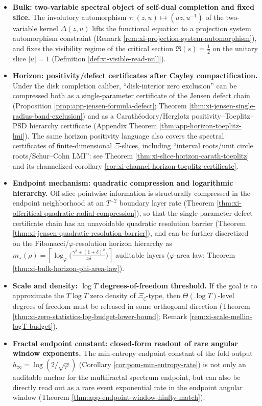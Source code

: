 \begin{itemize}
  \item \textbf{Bulk: two-variable spectral object of self-dual completion and fixed slice.}
  The involutory automorphism \(\tau:(z,u)\mapsto(uz,u^{-1})\) of the two-variable kernel \(\Delta(z,u)\) lifts the functional equation to a projection system automorphism constraint (Remark \ref{rem:xi-projection-system-automorphism}), and fixes the visibility regime of the critical section \(\Re(s)=\tfrac12\) on the unitary slice \(|u|=1\) (Definition \ref{def:xi-visible-read-null}).
  \item \textbf{Horizon: positivity/defect certificates after Cayley compactification.}
  Under the disk completion caliber, ``disk-interior zero exclusion'' can be compressed both as a single-parameter certificate of the Jensen defect chain (Proposition \ref{prop:app-jensen-formula-defect}; Theorem \ref{thm:xi-jensen-single-radius-band-exclusion}) and as a Carath\'eodory/Herglotz positivity--Toeplitz--PSD hierarchy certificate (Appendix Theorem \ref{thm:app-horizon-toeplitz-lmi}).
  The same horizon positivity language also covers the spectral certificates of finite-dimensional \(\Xi\)-slices, including ``interval roots/unit circle roots/Schur--Cohn LMI'': see Theorem \ref{thm:xi-slice-horizon-carath-toeplitz} and its channelized corollary \ref{cor:xi-channel-horizon-toeplitz-certificate}.
  \item \textbf{Endpoint mechanism: quadratic compression and logarithmic hierarchy.}
  Off-slice pointwise information is structurally compressed in the endpoint neighborhood at an \(T^{-2}\) boundary layer rate (Theorem \ref{thm:xi-offcritical-quadratic-radial-compression}), so that the single-parameter defect certificate chain has an unavoidable quadratic resolution barrier (Theorem \ref{thm:xi-jensen-quadratic-resolution-barrier}), and can be further discretized on the Fibonacci/\(\varphi\)-resolution horizon hierarchy as
  \(m_\star(\rho)=\left\lceil \log_{\varphi}\!\bigl(\frac{\gamma^2+(1+\delta)^2}{4\delta}\bigr)\right\rceil\)
  auditable layers (\(\varphi\)-area law: Theorem \ref{thm:xi-bulk-horizon-phi-area-law}).
  \item \textbf{Scale and density: \texorpdfstring{$\log T$}{log T} degrees-of-freedom threshold.}
  If the goal is to approximate the \(T\log T\) zero density of \(\Xi_\zeta\)-type, then \(\Theta(\log T)\)-level degrees of freedom must be released in some orthogonal direction (Theorem \ref{thm:xi-zero-statistics-log-budget-lower-bound}; Remark \ref{rem:xi-scale-mellin-logT-budget}).
  \item \textbf{Fractal endpoint constant: closed-form readout of rare angular window exponents.}
  The min-entropy endpoint constant of the fold output \(h_\infty=\log(2/\sqrt\varphi)\) (Corollary \ref{cor:pom-min-entropy-rate}) is not only an auditable anchor for the multifractal spectrum endpoint, but can also be directly read out as a rare event exponential rate in the endpoint angular window (Theorem \ref{thm:app-endpoint-window-hinfty-match}).
\end{itemize}
